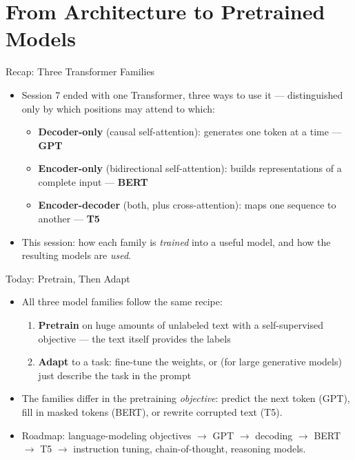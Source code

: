 
\section{From Architecture to Pretrained Models}
\begin{vbframe}{Recap: Three Transformer Families}
\begin{itemize}
  \item Session 7 ended with one Transformer, three ways to use it --- distinguished only by which positions may attend to which:
  \begin{itemize}
    \item \textbf{Decoder-only} (causal self-attention): generates one token at a time --- \textbf{GPT}
    \item \textbf{Encoder-only} (bidirectional self-attention): builds representations of a complete input --- \textbf{BERT}
    \item \textbf{Encoder-decoder} (both, plus cross-attention): maps one sequence to another --- \textbf{T5}
  \end{itemize}
  \item This session: how each family is \emph{trained} into a useful model, and how the resulting models are \emph{used}.
\end{itemize}
\end{vbframe}

\begin{vbframe}{Today: Pretrain, Then Adapt}
\begin{itemize}
  \item All three model families follow the same recipe:
  \begin{enumerate}
    \item \textbf{Pretrain} on huge amounts of unlabeled text with a self-supervised objective --- the text itself provides the labels
    \item \textbf{Adapt} to a task: fine-tune the weights, or (for large generative models) just describe the task in the prompt
  \end{enumerate}
  \item The families differ in the pretraining \emph{objective}: predict the next token (GPT), fill in masked tokens (BERT), or rewrite corrupted text (T5).
  \item Roadmap: language-modeling objectives $\to$ GPT $\to$ decoding $\to$ BERT $\to$ T5 $\to$ instruction tuning, chain-of-thought, reasoning models.
\end{itemize}
\end{vbframe}

